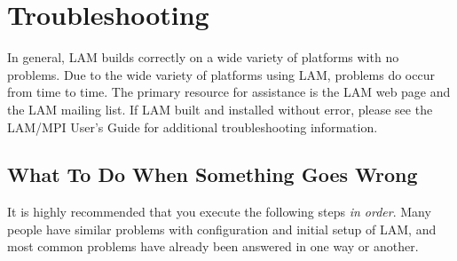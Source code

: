 %
% 
%
%

\chapter{Troubleshooting}
\label{sec:trouble}

In general, LAM builds correctly on a wide variety of platforms with
no problems.  Due to the wide variety of platforms using LAM, problems
do occur from time to time.  The primary resource for assistance is
the LAM web page and the LAM mailing list.  If LAM built and installed
without error, please see the LAM/MPI User's Guide for additional
troubleshooting information.


\section{What To Do When Something Goes Wrong}
\label{sec:trouble:report}

It is highly recommended that you execute the following steps {\em in
order}.  Many people have similar problems with configuration and
initial setup of LAM, and most common problems have already been
answered in one way or another.

